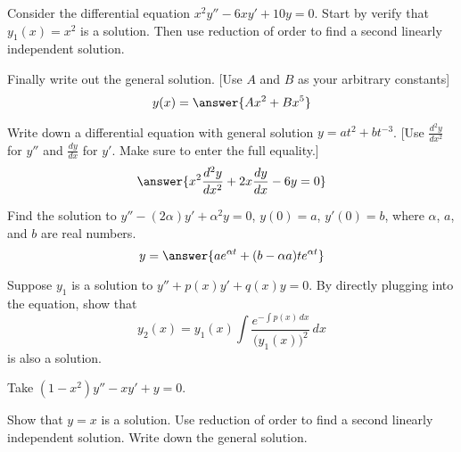 \documentclass{ximera}
\begin{document}
\begin{exercise}%
    Consider the differential equation $x^2y'' -6xy' + 10y = 0$.
    Start by verify that $y_1(x) = x^2$ is a solution.
    Then use reduction of order to find a second linearly independent solution.
    
    Finally write out the general solution. [Use $A$ and $B$ as your arbitrary constants] 
    \[
        y(x) = \answer{A x^2 + B x^{5}}
    \]

\end{exercise}

\begin{exercise}
    Write down a differential equation with general solution $y=at^2+bt^{-3}$. [Use $\frac{d^2y}{dx^2}$ for $y''$ and $\frac{dy}{dx}$ for $y'$. Make sure to enter the full equality.]
    \[
        \answer{x^2\frac{d^2y}{dx^2} + 2x\frac{dy}{dx} - 6y = 0}
    \]
\end{exercise}

\begin{exercise}
    Find the solution to $y''-(2\alpha) y' + \alpha^2 y=0$, $y(0) = a$, $y'(0)=b$, where $\alpha$, $a$, and $b$ are real numbers.
    \[
        y = \answer{ae^{\alpha t} + (b - \alpha a)te^{\alpha t}}
    \]
\end{exercise}

\begin{exercise} \label{exercise:reductionoforder}
    Suppose $y_1$ is a solution to $y'' + p(x) y' + q(x) y = 0$. By directly plugging into the equation, show that
    \begin{equation*}
        y_2(x) = y_1(x) \int \frac{e^{-\int p(x)\,dx}}{{\bigl(y_1(x)\bigr)}^2} \,dx
    \end{equation*}
    is also a solution.
\end{exercise}

\begin{exercise}%
    Take $(1-x^2)y''-xy' + y = 0$.
    \begin{tasks}
        \task Show that $y=x$ is a solution.
        \task Use reduction of order to find a second linearly independent solution.
        \task Write down the general solution.
    \end{tasks}
\end{exercise}
\end{document}
